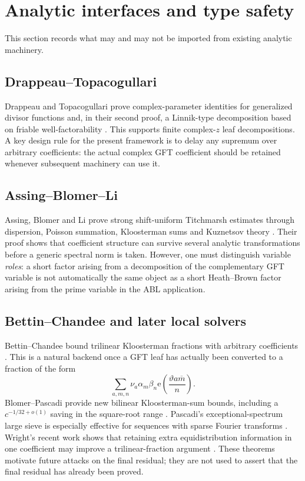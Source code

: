 \documentclass[11pt]{article}
\theoremstyle{definition}
\theoremstyle{remark}
\newcommand{\1}{\mathbf 1}
\newcommand{\e}{\mathrm e}
\begin{document}
\section{Analytic interfaces and type safety}\label{sec:type-safety}

This section records what may and may not be imported from existing analytic machinery.

\subsection{Drappeau--Topacogullari}

Drappeau and Topacogullari prove complex-parameter identities for generalized divisor functions and, in their second proof, a Linnik-type decomposition based on friable well-factorability \cite{DT}.  This supports finite complex-$z$ leaf decompositions.  A key design rule for the present framework is to delay any supremum over arbitrary coefficients: the actual complex GFT coefficient should be retained whenever subsequent machinery can use it.

\subsection{Assing--Blomer--Li}

Assing, Blomer and Li prove strong shift-uniform Titchmarsh estimates through dispersion, Poisson summation, Kloosterman sums and Kuznetsov theory \cite{ABL}.  Their proof shows that coefficient structure can survive several analytic transformations before a generic spectral norm is taken.  However, one must distinguish variable \emph{roles}: a short factor arising from a decomposition of the complementary GFT variable is not automatically the same object as a short Heath--Brown factor arising from the prime variable in the ABL application.

\subsection{Bettin--Chandee and later local solvers}

Bettin--Chandee bound trilinear Kloosterman fractions with arbitrary coefficients \cite{BC}.  This is a natural backend once a GFT leaf has actually been converted to a fraction of the form
\begin{equation}\label{eq:BC-shape}
\sum_{a,m,n}\nu_a\alpha_m\beta_n
\e\!\left(\frac{\vartheta a\overline m}{n}\right).
\end{equation}
Blomer--Pascadi provide new bilinear Kloosterman-sum bounds, including a $c^{-1/32+o(1)}$ saving in the square-root range \cite{BP}.  Pascadi's exceptional-spectrum large sieve is especially effective for sequences with sparse Fourier transforms \cite{PascadiLS}.  Wright's recent work shows that retaining extra equidistribution information in one coefficient may improve a trilinear-fraction argument \cite{Wright}.  These theorems motivate future attacks on the final residual; they are not used to assert that the final residual has already been proved.
\end{document}
